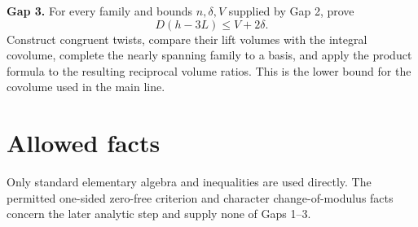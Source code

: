 \documentclass[11pt]{article}
\begin{document}
\medskip
\noindent\textbf{Gap 3.} For every family and bounds \(n,\delta,V\) supplied by Gap 2, prove
\[
D(h-3L)\leq V+2\delta.
\]
Construct congruent twists, compare their lift volumes with the integral covolume, complete the nearly spanning family to a basis, and apply the product formula to the resulting reciprocal volume ratios. This is the lower bound for the covolume used in the main line.

\section*{Allowed facts}
Only standard elementary algebra and inequalities are used directly. The permitted one-sided zero-free criterion and character change-of-modulus facts concern the later analytic step and supply none of Gaps 1--3.
\end{document}
